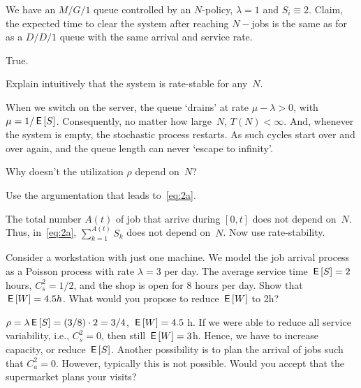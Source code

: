 \documentclass[stochastic-or.tex]{subfiles}
\begin{document}
\begin{truefalse}[5.6]
We have an $M/G/1$ queue controlled by an $N$-policy, $\lambda=1$ and $S_i\equiv 2$.
Claim, the expected time to clear the system after reaching $N-$jobs is the same as for as a $D/D/1$ queue with the same arrival and service rate.
\begin{solution}
        True.
\end{solution}
\end{truefalse}


\begin{exercise}
Explain intuitively that the system is rate-stable for any~$N$.
\begin{solution}
  When we switch on the server, the queue `drains' at rate $\mu-\lambda>0$, with $\mu=1/\,\mathsf{E}\left[S\right]$.
  Consequently, no matter how large~$N$, $T(N)<\infty$.
  And, whenever the system is empty, the stochastic process restarts.
  As such cycles start over and over again, and the queue length can never `escape to infinity'.
\end{solution}
\end{exercise}


\begin{exercise}
  Why doesn't  the utilization $\rho$ depend on~$N$?
\begin{hint}
 Use the argumentation that leads to~\cref{eq:2a}.
\end{hint}
\begin{solution}
  The total number $A(t)$ of job that arrive during $[0,t]$ does not depend on~$N$.
  Thus, in~\cref{eq:2a}, $\sum_{k=1}^{A(t)}S_k$ does not depend on~$N$.
  Now use rate-stability.
\end{solution}
\end{exercise}


\begin{exercise}\label{ex:l-241}
 Consider a workstation with just one machine.
 We model the job arrival process as a Poisson process with rate $\lambda=3$ per day.
 The average service time $\,\mathsf{E}\left[S\right] = 2$ hours, $C^2_s = 1/2$, and the shop is open for 8 hours per day.
Show that  $\,\mathsf{E}\left[W\right] = 4.5h$. What would you propose to reduce $\,\mathsf{E}\left[W\right]$ to 2h?
\begin{solution}
$\rho = \lambda \,\mathsf{E}\left[S\right] = (3/8)\cdot 2 = 3/4$, $\,\mathsf{E}\left[W\right] = 4.5$ h.
If we were able to reduce all service variability, i.e., $C_s^2=0$, then still $\,\mathsf{E}\left[W\right] = 3$h.
Hence, we have to increase capacity, or reduce $\,\mathsf{E}\left[S\right]$.
Another possibility is to plan the arrival of jobs such that $C_a^2=0$.
However, typically this is not possible.
Would you accept that the supermarket plans your visits?
\end{solution}
\end{exercise}
\end{document}
